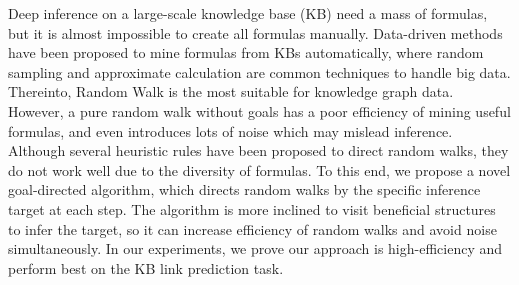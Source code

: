 Deep inference on a large-scale knowledge base (KB) need a mass of formulas, but it is almost impossible to create all formulas manually.  Data-driven methods have been proposed to mine formulas from KBs automatically, where random sampling and approximate calculation are common techniques to handle big data. Thereinto, Random Walk is the most suitable for knowledge graph data. However, a pure random walk without goals has a poor efficiency of mining useful formulas, and even introduces lots of noise which may mislead inference. Although several heuristic rules have been proposed to direct random walks, they do not work well due to the diversity of formulas. To this end, we propose a novel goal-directed algorithm, which directs random walks by the specific inference target at each step. The algorithm is more inclined to visit beneficial structures to infer the target, so it can increase efficiency of random walks and avoid noise simultaneously. In our experiments, we prove our approach is high-efficiency and perform best on the KB link prediction task.
